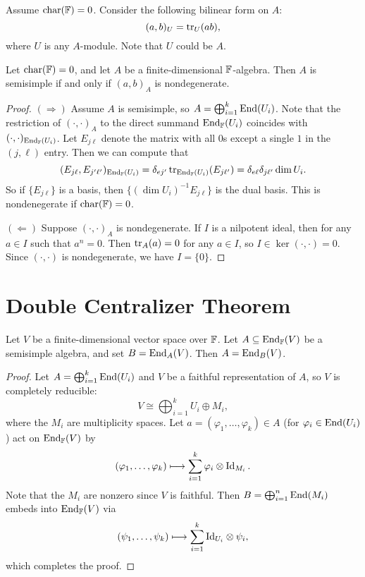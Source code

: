 \begin{remark}
  Assume $\operatorname{char}(\mathbb{F}) = 0$.
  Consider the following bilinear
  form on $A$:
  \[
    (a, b)_U = \operatorname{tr}_U(ab),
  \]
  where $U$ is any $A$-module. Note that
  $U$ could be $A$.
\end{remark}

\begin{theorem}
  Let $\operatorname{char}(\mathbb{F}) = 0$, and let
  $A$ be a finite-dimensional $\mathbb{F}$-algebra.
  Then $A$ is semisimple if and only if
  $(a, b)_A$ is nondegenerate.
\end{theorem}

\begin{proof}
  $(\Rightarrow)$ Assume $A$ is
  semisimple, so
  $A = \bigoplus_{i = 1}^k \operatorname{End}(U_i)$.
  Note that the restriction of
  $(\cdot, \cdot)_A$ to the
  direct summand $\operatorname{End}_{\mathbb{F}}(U_i)$
  coincides with
  $(\cdot, \cdot)_{\operatorname{End}_{\mathbb{F}}(U_i)}$.
  Let $E_{j \ell}$ denote the matrix with
  all $0$s except a single $1$ in the
  $(j, \ell)$ entry. Then we can compute
  that
  \[
    (E_{j \ell}, E_{j' \ell'})_{\operatorname{End}_{\mathbb{F}}(U_i)}
    = \delta_{ej'} \operatorname{tr}_{\operatorname{End}_{\mathbb{F}}(U_i)}(E_{j\ell'})
    = \delta_{e\ell} \delta_{j \ell'}
    \dim U_i.
  \]
  So if $\{E_{j \ell}\}$ is a basis, then
  $\{(\dim U_i)^{-1} E_{j \ell}\}$
  is the dual basis.
  This is nondenegerate if
  $\operatorname{char}(\mathbb{F}) = 0$.

  $(\Leftarrow)$ Suppose $(\cdot, \cdot)_A$
  is nondegenerate. If $I$ is a nilpotent
  ideal, then for any $a \in I$
  such that $a^n = 0$. Then $\operatorname{tr}_A(a) = 0$
  for any $a \in I$, so
  $I \in \ker(\cdot, \cdot) = 0$.
  Since $(\cdot, \cdot)$ is nondegenerate,
  we have $I = \{0\}$.
\end{proof}

\section{Double Centralizer Theorem}

\begin{theorem}
  Let $V$ be a finite-dimensional vector
  space over $\mathbb{F}$. Let
  $A \subseteq \operatorname{End}_{\mathbb{F}}(V)$ be a semisimple
  algebra, and
  set $B = \operatorname{End}_A(V)$. Then
  $A = \operatorname{End}_B(V)$.
\end{theorem}

\begin{proof}
  Let $A = \bigoplus_{i = 1}^k \operatorname{End}(U_i)$
  and $V$ be a faithful representation
  of $A$, so $V$ is completely reducible:
  \[
    V \cong \bigoplus_{i = 1}^k U_i \oplus M_i,
  \]
  where the $M_i$ are multiplicity spaces.
  Let $a = (\varphi_1, \dots, \varphi_k) \in A$
  (for $\varphi_i \in \operatorname{End}(U_i)$)
  act on $\operatorname{End}_{\mathbb{F}}(V)$ by
  \[
    (\varphi_1, \dots, \varphi_k)
    \longmapsto
    \sum_{i = 1}^k \varphi_i \otimes \operatorname{Id}_{M_i}.
  \]
  Note that the $M_i$ are nonzero
  since $V$ is faithful. Then 
  $B = \bigoplus_{i = 1}^n \operatorname{End}(M_i)$
  embeds into $\operatorname{End}_{\mathbb{F}}(V)$ via
  \[
    (\psi_1, \dots, \psi_k)
    \longmapsto
    \sum_{i = 1}^k {\operatorname{Id}_{U_i}} \otimes \psi_i,
  \]
  which completes the proof.
\end{proof}

